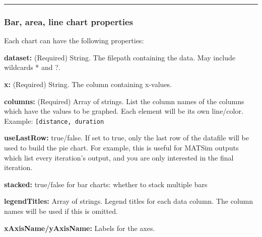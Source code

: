 \begin{center}\rule{0.5\linewidth}{0.5pt}\end{center}

\hypertarget{bar-area-line-chart-properties}{%
\subsubsection{Bar, area, line chart
properties}\label{bar-area-line-chart-properties}}

Each chart can have the following properties:

\textbf{dataset:} (Required) String. The filepath containing the data.
May include wildcards * and ?.

\textbf{x:} (Required) String. The column containing x-values.

\textbf{columns:} (Required) Array of strings. List the column names of
the columns which have the values to be graphed. Each element will be
its own line/color. Example:
\texttt{{[}\textquotesingle{}distance\textquotesingle{},\ \textquotesingle{}duration\textquotesingle{}{]}}

\textbf{useLastRow:} true/false. If set to true, only the last row of
the datafile will be used to build the pie chart. For example, this is
useful for MATSim outputs which list every iteration's output, and you
are only interested in the final iteration.

\textbf{stacked:} true/false for bar charts: whether to stack multiple
bars

\textbf{legendTitles:} Array of strings. Legend titles for each data
column. The column names will be used if this is omitted.

\textbf{xAxisName/yAxisName:} Labels for the axes.
